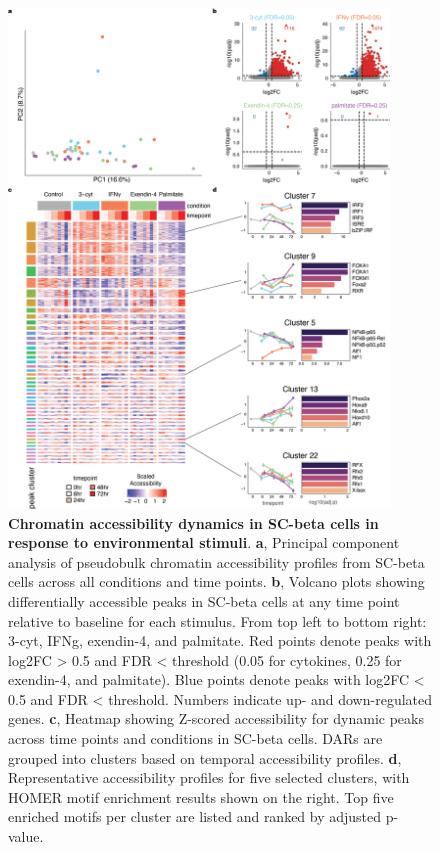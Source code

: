 \begin{figure}[p]
    \centering
    \includegraphics[width=0.9\textwidth, height=0.745\textheight]{3_figures-and-files/Fig3.png}
    \caption[Chromatin accessibility dynamics in SC-beta cells]{\textbf{Chromatin accessibility dynamics in SC-beta cells in response to environmental stimuli}. \textbf{a}, Principal component analysis of pseudobulk chromatin accessibility profiles from SC-beta cells across all conditions and time points. \textbf{b}, Volcano plots showing differentially accessible peaks in SC-beta cells at any time point relative to baseline for each stimulus. From top left to bottom right: 3-cyt, IFNg, exendin-4, and palmitate. Red points denote peaks with log2FC > 0.5 and FDR < threshold (0.05 for cytokines, 0.25 for exendin-4, and palmitate). Blue points denote peaks with log2FC < 0.5 and FDR < threshold. Numbers indicate up- and down-regulated genes. \textbf{c}, Heatmap showing Z-scored accessibility for dynamic peaks across time points and conditions in SC-beta cells. DARs are grouped into clusters based on temporal accessibility profiles. \textbf{d}, Representative accessibility profiles for five selected clusters, with HOMER motif enrichment results shown on the right. Top five enriched motifs per cluster are listed and ranked by adjusted p-value.}
    \label{fig:3 Figure 3}
\end{figure}

